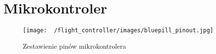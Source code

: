 \section{Mikrokontroler}

\begin{figure}
  \texttt{[image: ~/flight\_controller/images/bluepill\_pinout.jpg]}
  \caption{Zestawienie pinów mikrokontrolera}
\end{figure}
